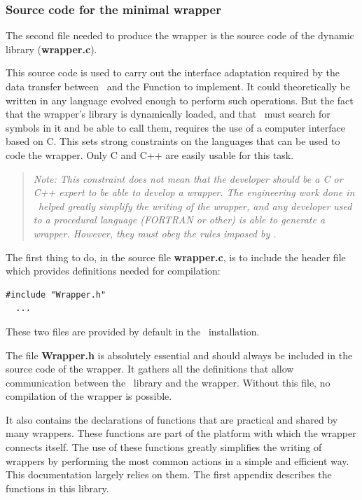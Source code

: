 \subsubsection{Source code for the minimal wrapper}

The second file needed to produce the wrapper is the source code of the dynamic library ({\bf wrapper.c}).

This source code is used to carry out the interface adaptation required by the data transfer between \OT\ and the Function to implement. It could theoretically be written in any language evolved enough to perform such operations. But the fact that the wrapper's library is dynamically loaded, and that \OT\ must search for symbols in it and be able to call them, requires the use of a computer interface based on C. This sets strong constraints on the languages that can be used to code the wrapper. Only C and C++ are easily usable for this task.

\small
\begin{quote}
  \textit{Note: This constraint does not mean that the developer should be a C or C++ expert to be able to develop a wrapper. The engineering work done in \OT\ helped greatly simplify the writing of the wrapper, and any developer used to a procedural language (FORTRAN or other) is able to generate a wrapper. However, they must obey the rules imposed by \OT.}
\end{quote}
\normalsize

The first thing to do, in the source file {\bf wrapper.c}, is to include the header file which provides definitions needed for compilation:

\lstset{language=C, basicstyle=\normalsize}
\begin{lstlisting}[frame=TBRL]
  #include "Wrapper.h"
  ...
\end{lstlisting}

These two files are provided by default in the \OT\ installation.

The file {\bf Wrapper.h} is absolutely essential and should always be included in the source code of the wrapper. It gathers all the definitions that allow communication between the \OT\ library and the wrapper. Without this file, no compilation of the wrapper is possible.

It also contains the declarations of functions that are practical and shared by many wrappers. These functions are part of the platform with which the wrapper connects itself. The use of these functions greatly simplifies the writing of wrappers by performing the most common actions in a simple and efficient way. This documentation largely relies on them. The first appendix describes the functions in this library.

